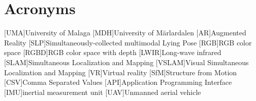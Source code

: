 \section*{Acronyms}
\begin{acronym}[MPC] %
    [UMA]{University of Malaga}
    [MDH]{University of Märlardalen}
    [AR]{Augmented Reality}
    [SLP]{Simultaneously-collected multimodal Lying Pose}
    [RGB]{RGB color space}
    [RGBD]{RGB color space with depth}
    [LWIR]{Long-wave infrared}
    [SLAM]{Simultaneous Localization and Mapping}
    [VSLAM]{Visual Simultaneous Localization and Mapping}
    [VR]{Virtual reality}
    [SfM]{Structure from Motion}
    [CSV]{Comma Separated Values}
    [API]{Application Programming Interface}
    [IMU]{inertial measurement unit}
    [UAV]{Unmanned aerial vehicle}
\end{acronym}

\newpage